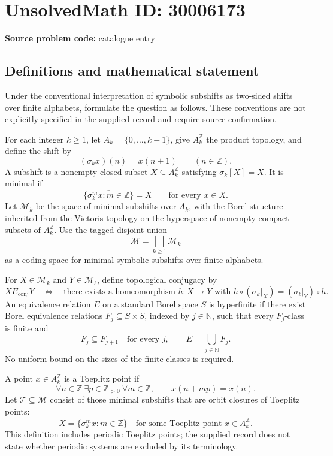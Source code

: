 \documentclass[11pt]{article}
\newcommand{\N}{\mathbb{N}}
\newcommand{\Z}{\mathbb{Z}}
\begin{document}
\section*{UnsolvedMath ID: 30006173}
\textbf{Source problem code:} catalogue entry
\subsection{Definitions and mathematical statement}
Under the conventional interpretation of symbolic subshifts as two-sided shifts over finite alphabets, formulate the question as follows. These conventions are not explicitly specified in the supplied record and require source confirmation.

For each integer \(k\geq 1\), let \(A_k=\{0,\ldots,k-1\}\), give \(A_k^{\Z}\) the product topology, and define the shift by
\[
(\sigma_k x)(n)=x(n+1)\qquad(n\in\Z).
\]
A subshift is a nonempty closed subset \(X\subseteq A_k^{\Z}\) satisfying \(\sigma_k[X]=X\). It is minimal if
\[
\overline{\{\sigma_k^m x:m\in\Z\}}=X
\qquad\text{for every }x\in X.
\]
Let \(\mathcal M_k\) be the space of minimal subshifts over \(A_k\), with the Borel structure inherited from the Vietoris topology on the hyperspace of nonempty compact subsets of \(A_k^{\Z}\). Use the tagged disjoint union
\[
\mathcal M=\bigsqcup_{k\geq1}\mathcal M_k
\]
as a coding space for minimal symbolic subshifts over finite alphabets.

For \(X\in\mathcal M_k\) and \(Y\in\mathcal M_\ell\), define topological conjugacy by
\[
X\mathrel{E_{\mathrm{conj}}}Y
\quad\Longleftrightarrow\quad
\text{there exists a homeomorphism }h:X\longrightarrow Y
\text{ with }h\circ(\sigma_k|_X)=(\sigma_\ell|_Y)\circ h.
\]
An equivalence relation \(E\) on a standard Borel space \(S\) is hyperfinite if there exist Borel equivalence relations \(F_j\subseteq S\times S\), indexed by \(j\in\N\), such that every \(F_j\)-class is finite and
\[
F_j\subseteq F_{j+1}\quad\text{for every }j,
\qquad E=\bigcup_{j\in\N}F_j.
\]
No uniform bound on the sizes of the finite classes is required.

A point \(x\in A_k^{\Z}\) is a Toeplitz point if
\[
\forall n\in\Z\ \exists p\in\Z_{>0}\ \forall m\in\Z,
\qquad x(n+mp)=x(n).
\]
Let \(\mathcal T\subseteq\mathcal M\) consist of those minimal subshifts that are orbit closures of Toeplitz points:
\[
X=\overline{\{\sigma_k^m x:m\in\Z\}}
\quad\text{for some Toeplitz point }x\in A_k^{\Z}.
\]
This definition includes periodic Toeplitz points; the supplied record does not state whether periodic systems are excluded by its terminology.
\end{document}
